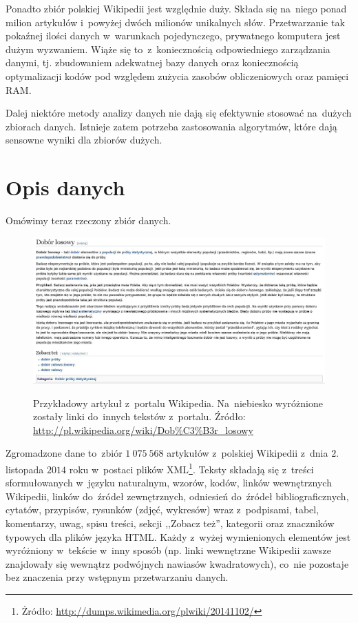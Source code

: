 \documentclass{praca1}
\begin{document}
Ponadto zbiór polskiej Wikipedii jest względnie duży. Składa się na~niego ponad milion artykułów i~powyżej dwóch milionów unikalnych słów. Przetwarzanie tak pokaźnej ilości danych w~warunkach pojedynczego, prywatnego komputera jest dużym wyzwaniem. Wiąże się to~z~koniecznością odpowiedniego zarządzania danymi, tj. zbudowaniem adekwatnej bazy danych oraz koniecznością optymalizacji kodów pod względem zużycia zasobów obliczeniowych oraz pamięci RAM.

Dalej niektóre metody analizy danych nie dają się efektywnie stosować na~dużych zbiorach danych. Istnieje zatem potrzeba zastosowania algorytmów, które dają sensowne wyniki dla zbiorów dużych. 


\section{Opis danych}

Omówimy teraz rzeczony zbiór danych.

\begin{figure}[!h]
  \centering
  \includegraphics[width=450pt]{wiki2.jpg}\\
  \caption{Przykładowy artykuł z~portalu Wikipedia. Na~niebiesko wyróżnione zostały linki do~innych tekstów z~portalu. Źródło: \url{http://pl.wikipedia.org/wiki/Dob\%C3\%B3r\_losowy}}\label{wiki}
\end{figure}

Zgromadzone dane to~zbiór $1\ 075\ 568$ artykułów z~polskiej Wikipedii z~dnia $2.$ listopada $2014$ roku w~postaci plików XML\footnote{Żródło: \url{http://dumps.wikimedia.org/plwiki/20141102/}}. Teksty składają się z~treści sformułowanych w~języku naturalnym, wzorów, kodów, linków wewnętrznych Wikipedii, linków do~źródeł zewnętrznych, odniesień do~źródeł bibliograficznych, cytatów, przypisów, rysunków (zdjęć, wykresów) wraz z~podpisami, tabel, komentarzy, uwag, spisu treści, sekcji ,,Zobacz też'', kategorii oraz znaczników typowych dla plików języka HTML. Każdy z~wyżej wymienionych elementów jest wyróżniony w~tekście w~inny sposób (np. linki wewnętrzne Wikipedii zawsze znajdowały się wewnątrz podwójnych nawiasów kwadratowych), co~nie pozostaje bez znaczenia przy wstępnym przetwarzaniu danych.
\end{document}
